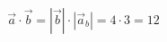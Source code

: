 \documentclass[preview]{standalone}
\begin{document}
\begin{align*}
\vec{a} \cdot \vec{b} = |\vec{b}| \cdot |\vec{a}_b| = 4 \cdot 3 = 12
\end{align*}
\end{document}
